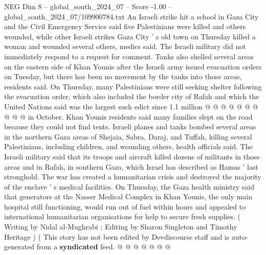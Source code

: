 \begin{textsample}{NEG Dim 8 – global\_south\_2024\_07 – Score -1.00 – global\_south\_2024\_07/109900784.txt}
An Israeli strike hit a school in Gaza City and the Civil Emergency Service said five Palestinians were killed and others wounded, while other Israeli strikes Gaza City ' s old town on Thursday killed a woman and wounded several others, medics said.
The Israeli military did not immediately respond to a request for comment.
Tanks also shelled several areas on the eastern side of Khan Younis after the Israeli army issued evacuation orders on Tuesday, but there has been no movement by the tanks into those areas, residents said.
On Thursday, many Palestinians were still seeking shelter following the evacuation order, which also included the border city of Rafah and which the United Nations said was the largest such edict since 1.1 million @ @ @ @ @ @ @ @ @ @ in October.
Khan Younis residents said many families slept on the road because they could not find tents.
Israeli planes and tanks bombed several areas in the northern Gaza areas of Shejaia, Sabra, Daraj, and Tuffah, killing several Palestinians, including children, and wounding others, health officials said.
The Israeli military said that its troops and aircraft killed dozens of militants in those areas and in Rafah, in southern Gaza, which Israel has described as Hamas ' last stronghold.
The war has created a humanitarian crisis and destroyed the majority of the enclave ' s medical facilities.
On Thursday, the Gaza health ministry said that generators at the Nasser Medical Complex in Khan Younis, the only main hospital still functioning, would run out of fuel within hours and appealed to international humanitarian organisations for help to secure fresh supplies. ( Writing by Nidal al-Mughrabi ; Editing by Sharon Singleton and Timothy Heritage ) ( This story has not been edited by Devdiscourse staff and is auto-generated from a \textbf{syndicated} feed. @ @ @ @ @ @ @

\end{textsample}
